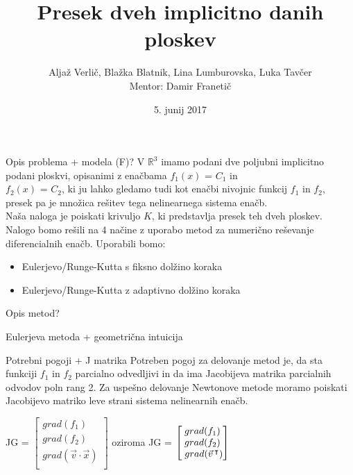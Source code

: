\documentclass{beamer}
\title{Presek dveh implicitno danih ploskev}
\author[Avtorji]{Aljaž Verlič, Blažka Blatnik, Lina Lumburovska, Luka Tavčer\\
Mentor: Damir Franetič}
\date{5. junij 2017}
\begin{document}
\begin{frame}
  \titlepage
\end{frame}

\begin{frame}{Opis problema + modela (F)?}
   V $\mathbb{R}^3$ imamo podani dve poljubni implicitno podani ploskvi, opisanimi z enačbama $f_{1}(x)$ = $C_{1}$ in\\ $f_{2}(x)$ = $C_{2}$, ki ju lahko gledamo tudi kot enačbi nivojnic funkcij $f_{1}$ in $f_{2}$, presek pa je množica rešitev tega nelinearnega sistema enačb.\\
   Naša naloga je poiskati krivuljo $K$, ki predstavlja presek teh dveh ploskev.\\
   Nalogo bomo rešili na 4 načine z uporabo metod za numerično reševanje diferencialnih enačb. Uporabili bomo:
   \begin{itemize}  
   	\item Eulerjevo/Runge-Kutta s fiksno dolžino koraka
   	\item Eulerjevo/Runge-Kutta z adaptivno dolžino koraka
   \end{itemize}
\end{frame}

\begin{frame}{Opis metod?}

\end{frame}

\begin{frame}{Eulerjeva metoda + geometrična intuicija}

\end{frame}

\begin{frame}{Potrebni pogoji + J matrika}
	Potreben pogoj za delovanje metod je, da sta funkciji $f_{1}$ in $f_{2}$ parcialno odvedljivi in da ima Jacobijeva matrika parcialnih odvodov poln rang 2. Za uspešno delovanje Newtonove metode moramo poiskati Jacobijevo matriko leve strani sistema nelinearnih enačb.
	
	\begin{center}
		JG = $\begin{bmatrix}
		grad(f_{1}) \\
		grad(f_{2}) \\
		grad(\vec{v} \cdot \vec{x}) \\
		\end{bmatrix}$
		oziroma
		JG = $\begin{bmatrix}
		grad(f_{1}) \\
		grad(f_{2}) \\
		\hspace{1mm}grad(\vec{v}\hspace{0.5mm}^\intercal) \\
		\end{bmatrix}$
	\end{center}
\end{frame}
\end{document}
